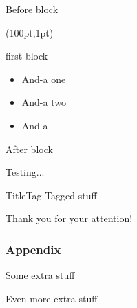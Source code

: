 \documentclass[mathserif, fleqn]{beamer}
\begin{document}
\begin{frame}
  Before block
  \begin{textblock*}{200pt} (100pt,1pt)
    \begin{itembox}{first block}
      \begin{itemize}
      \item And-a one
      \item And-a two
      \item And-a
      \end{itemize}
    \end{itembox}
  \end{textblock*}


  After block
\end{frame}

\begin{frame}
  \begin{fancybox}{Testing...}
    \lipsum[2]
  \end{fancybox}

  \begin{tagbox}{Title}{Tag}%
    Tagged stuff
  \end{tagbox}
\end{frame}

\begin{frame}[plain,c]
  \renewcommand*\item{\olditem[]}
  \begin{center}
    \textcolor{aiphired}{\LARGE Thank you for your attention!}
  \end{center}
\end{frame}

\appendix
\backupbegin

\begin{frame}
  \frametitle{Appendix}
  Some extra stuff
\end{frame}

\begin{frame}
  Even more extra stuff
\end{frame}

\backupend
\end{document}
